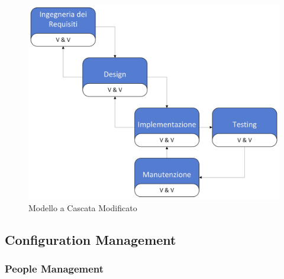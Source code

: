 \documentclass{article}
\begin{document}
\begin{figure}[H]
    \centering
    \includegraphics[width=\linewidth]{imgs/Modello a Cascata_0.png}
    \caption{Modello a Cascata Modificato}
    \label{fig:enter-label}
\end{figure}



\subsection{Configuration Management}
\subsubsection{People Management}
\end{document}
